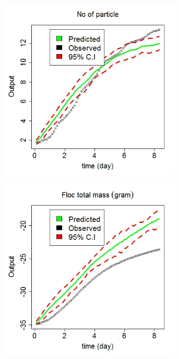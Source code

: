 \begin{figure}[!ht]
\begin{subfigure}[b]{.6\textwidth}
\end{subfigure}\vspace*{-0.4em}
\begin{subfigure}[b]{.6\textwidth}
\includegraphics[width=1\textwidth]{p1d/p1d_4}
\end{subfigure}\hspace*{-.5em}
\centering
\begin{subfigure}[b]{.60\textwidth}
\includegraphics[width=1\textwidth]{p1d/p1d_5}

\end{subfigure}
\end{figure}
